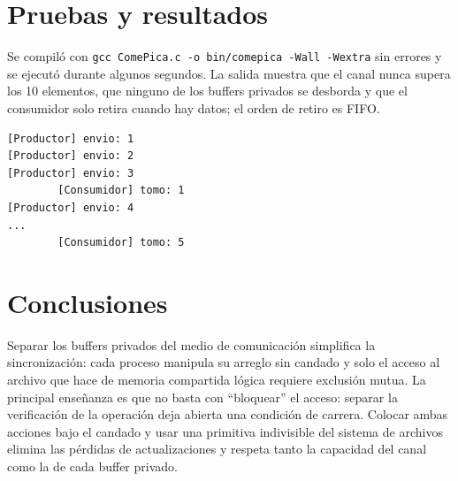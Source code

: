 \documentclass[12pt,letterpaper]{article}
\begin{document}
\section{Pruebas y resultados}
Se compil\'o con \texttt{gcc ComePica.c -o bin/comepica -Wall -Wextra} sin
errores y se ejecut\'o durante algunos segundos. La salida muestra que el canal
nunca supera los 10 elementos, que ninguno de los buffers privados se desborda
y que el consumidor solo retira cuando hay datos; el orden de retiro es FIFO.

\begin{lstlisting}
[Productor] envio: 1
[Productor] envio: 2
[Productor] envio: 3
        [Consumidor] tomo: 1
[Productor] envio: 4
...
        [Consumidor] tomo: 5
\end{lstlisting}

\section{Conclusiones}
Separar los buffers privados del medio de comunicaci\'on simplifica la
sincronizaci\'on: cada proceso manipula su arreglo sin candado y solo el
acceso al archivo que hace de memoria compartida l\'ogica requiere
exclusi\'on mutua. La principal ense\~nanza es que no basta con ``bloquear'' el
acceso: separar la verificaci\'on de la operaci\'on deja abierta una
condici\'on de carrera. Colocar ambas acciones bajo el candado y usar una
primitiva indivisible del sistema de archivos elimina las p\'erdidas de
actualizaciones y respeta tanto la capacidad del canal como la de cada buffer
privado.
\end{document}

